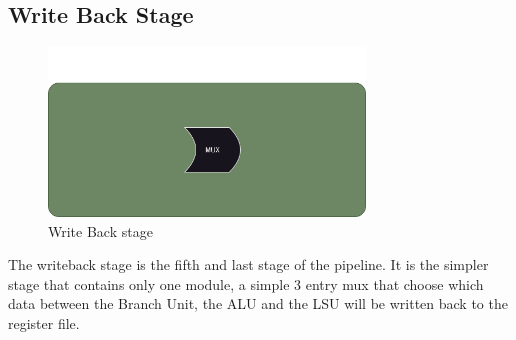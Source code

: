 \subsection{Write Back Stage}

\begin{figure}[H]
    \centering
    \includegraphics[width=0.75\textwidth]{../diagrams/writeback/wb_stage.png}
    \caption{Write Back stage}
    \label{fig:wb_stage}
\end{figure}

The writeback stage is the fifth and last stage of the pipeline. It is the simpler stage that contains only one module,
a simple 3 entry mux that choose which data between the Branch Unit, the ALU and the LSU will be written back to the 
register file.
